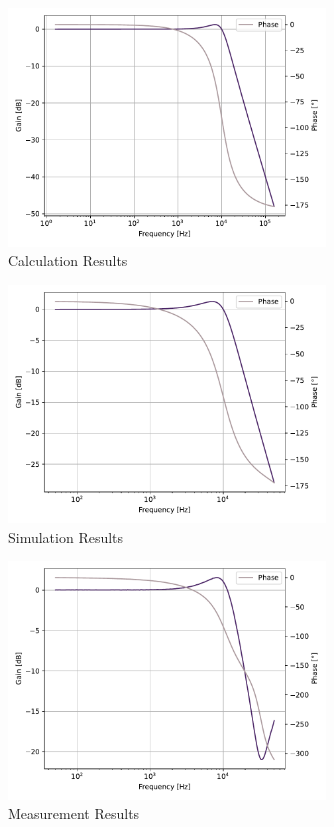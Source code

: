 \documentclass[11pt]{texMemo-gibbons}
\begin{document}
\begin{figure}
  \begin{center}
    \includegraphics[width=0.75\textwidth]{../pdf/calculation.pdf}
  \end{center}
  \caption{Calculation Results}\label{fig:calc}
\end{figure}

\begin{figure}
  \begin{center}
    \includegraphics[width=0.75\textwidth]{../pdf/simulation.pdf}
  \end{center}
  \caption{Simulation Results}\label{fig:sim}
\end{figure}

\begin{figure}
  \begin{center}
    \includegraphics[width=0.75\textwidth]{../pdf/measurements.pdf}
  \end{center}
  \caption{Measurement Results}\label{fig:meas}
\end{figure}
\end{document}
